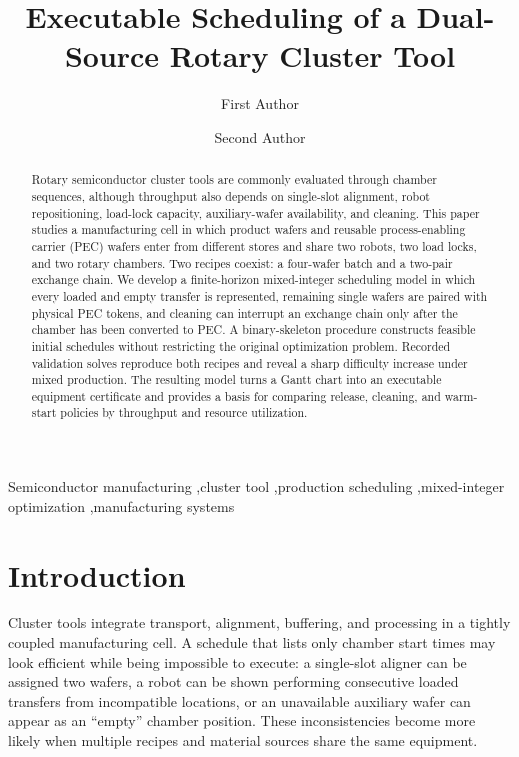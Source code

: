 \documentclass[5p,times,procedia]{elsarticle}
\begin{document}
\begin{frontmatter}


\title{Executable Scheduling of a Dual-Source Rotary Cluster Tool}

\author[a]{First Author}
\author[a]{Second Author}
\address[a]{Affiliation, Street, City and Postcode, Country}

\begin{abstract}
Rotary semiconductor cluster tools are commonly evaluated through chamber sequences, although throughput also depends on single-slot alignment, robot repositioning, load-lock capacity, auxiliary-wafer availability, and cleaning. This paper studies a manufacturing cell in which product wafers and reusable process-enabling carrier (PEC) wafers enter from different stores and share two robots, two load locks, and two rotary chambers. Two recipes coexist: a four-wafer batch and a two-pair exchange chain. We develop a finite-horizon mixed-integer scheduling model in which every loaded and empty transfer is represented, remaining single wafers are paired with physical PEC tokens, and cleaning can interrupt an exchange chain only after the chamber has been converted to PEC. A binary-skeleton procedure constructs feasible initial schedules without restricting the original optimization problem. Recorded validation solves reproduce both recipes and reveal a sharp difficulty increase under mixed production. The resulting model turns a Gantt chart into an executable equipment certificate and provides a basis for comparing release, cleaning, and warm-start policies by throughput and resource utilization.
\end{abstract}

\begin{keyword}
Semiconductor manufacturing \sep cluster tool \sep production scheduling \sep mixed-integer optimization \sep manufacturing systems
\end{keyword}

\end{frontmatter}

\section{Introduction}

Cluster tools integrate transport, alignment, buffering, and processing in a tightly coupled manufacturing cell. A schedule that lists only chamber start times may look efficient while being impossible to execute: a single-slot aligner can be assigned two wafers, a robot can be shown performing consecutive loaded transfers from incompatible locations, or an unavailable auxiliary wafer can appear as an ``empty'' chamber position. These inconsistencies become more likely when multiple recipes and material sources share the same equipment.
\end{document}
